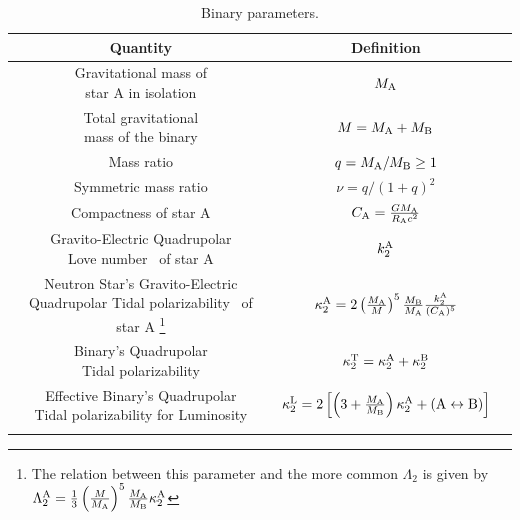 \documentclass[aps,prl,onecolumn,superscriptaddress,groupedaddress,nofootinbib,floatfix,notitlepage]{revtex4-1}
\newcommand{\stext}[1]{\text{#1}}
\begin{document}
 \begin{table}[t]
   \centering    
   \caption{ Binary parameters. }
   \begin{tabular}{ccc}        
     \hline
     Quantity & Definition & \\
     \hline
     \hline
     \makecell{Gravitational mass of \\ star A in isolation} & 
     $ M_{\rm A} $ &  \\
     \hline
     \makecell{Total gravitational \\ mass of the binary} & 
     $ M = M_{\rm A} + M_{\rm B} $ &  \\
     \hline
     Mass ratio & 
     $ q = M_{\rm A} / M_{\rm B} \geq 1$ & \\
     \hline
     Symmetric mass ratio & 
     $ \nu = q/(1+q)^2 $&\\
     \hline
     Compactness of star A & 
     $ C_{\rm A} = \frac{G M_{\rm A}}{R_{\rm A} c^2} $ &\\    
     \hline
     \makecell{Gravito-Electric Quadrupolar \\ Love number~\cite{Damour:2009wj} of star A} & 
     $ k_2^{\rm A} $ &\\     
     \hline
     \makecell{Neutron Star's Gravito-Electric \\ Quadrupolar Tidal polarizability~\cite{Damour:2009wj} of star A
     \footnote{The relation between this parameter and the more common $\Lambda_2$ is given by
     $\Lambda_2^\stext{A} = \frac{1}{3} \left(\frac{M}{M_{\rm A}}\right)^5 \frac{M_{\rm A}}{M_\stext{B}} \kappa_2^\stext{A}$}} & 
     $ \kappa_2^{\rm A} = 2\left(\frac{M_{\rm A}}{M}\right)^5 \frac{M_{\rm B}}{M_\stext{A}}
     \frac{k_2^{\rm A}}{(C_{\rm A})^5}$ &\\
     \hline
     \makecell{Binary's Quadrupolar \\ Tidal polarizability} & 
     $ \kappa_2^{\rm T} = \kappa_2^{\rm A} + \kappa_2^{\rm B} $ &\\
     \hline
     \makecell{Effective Binary's Quadrupolar \\ Tidal polarizability for Luminosity} & 
     $ \kappa_2^{\rm L} = 2 \left[\left( 3 + \frac{M_{\rm A}}{M_{\rm B}} \right)\kappa_2^{\rm A}  + ({\rm A} \leftrightarrow {\rm B}) \right] $ &\\
     \hline
     &&\\
   \end{tabular}
  \label{tab:bin_par}
 \end{table}
\end{document}
